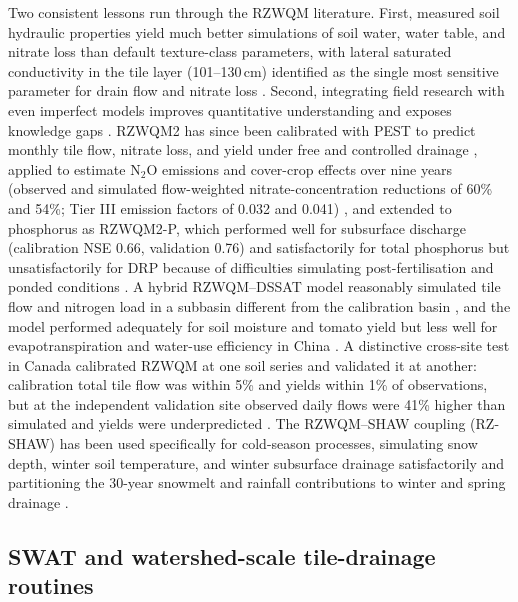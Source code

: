 Two consistent lessons run through the RZWQM literature. First, measured soil hydraulic properties yield much better simulations of soil water, water table, and nitrate loss than default texture-class parameters, with lateral saturated conductivity in the tile layer (101--130\,cm) identified as the single most sensitive parameter for drain flow and nitrate loss \parencite{Ma2007c,Ahuja2007}. Second, integrating field research with even imperfect models improves quantitative understanding and exposes knowledge gaps \parencite{Ahuja2007}. RZWQM2 has since been calibrated with PEST to predict monthly tile flow, nitrate loss, and yield under free and controlled drainage \parencite{Fang2012}, applied to estimate N$_2$O emissions and cover-crop effects over nine years (observed and simulated flow-weighted nitrate-concentration reductions of 60\% and 54\%; Tier III emission factors of 0.032 and 0.041) \parencite{Gillette2018}, and extended to phosphorus as RZWQM2-P, which performed well for subsurface discharge (calibration NSE 0.66, validation 0.76) and satisfactorily for total phosphorus but unsatisfactorily for DRP because of difficulties simulating post-fertilisation and ponded conditions \parencite{BinShokrana2023b}. A hybrid RZWQM--DSSAT model reasonably simulated tile flow and nitrogen load in a subbasin different from the calibration basin \parencite{Singer2011}, and the model performed adequately for soil moisture and tomato yield but less well for evapotranspiration and water-use efficiency in China \parencite{Zhang2022b}. A distinctive cross-site test in Canada calibrated RZWQM at one soil series and validated it at another: calibration total tile flow was within 5\% and yields within 1\% of observations, but at the independent validation site observed daily flows were 41\% higher than simulated and yields were underpredicted \parencite{Ahmed2007}. The RZWQM--SHAW coupling (RZ-SHAW) has been used specifically for cold-season processes, simulating snow depth, winter soil temperature, and winter subsurface drainage satisfactorily and partitioning the 30-year snowmelt and rainfall contributions to winter and spring drainage \parencite{Li2024b,Li2025}.

\subsection{SWAT and watershed-scale tile-drainage routines}

